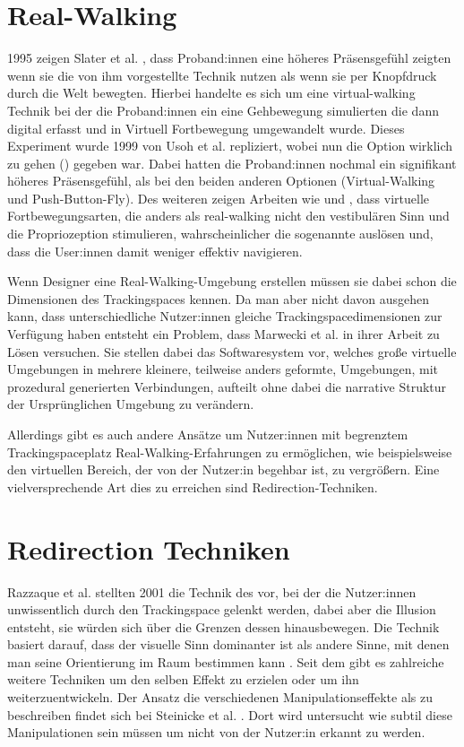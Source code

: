 \section{Real-Walking}
1995 zeigen Slater et al. \cite{taking-steps}, dass Proband:innen eine höheres Präsensgefühl zeigten wenn sie die von ihm vorgestellte Technik  nutzen als wenn sie per Knopfdruck durch die Welt bewegten. Hierbei handelte es sich um eine virtual-walking Technik bei der die Proband:innen ein eine Gehbewegung simulierten die dann digital erfasst und in Virtuell Fortbewegung umgewandelt wurde. Dieses Experiment wurde 1999 von Usoh et al. \cite{usoh-vergleich-1999} repliziert, wobei nun die Option wirklich zu gehen () gegeben war. Dabei hatten die Proband:innen nochmal ein signifikant höheres Präsensgefühl, als bei den beiden anderen Optionen (Virtual-Walking und Push-Button-Fly).
Des weiteren zeigen Arbeiten wie \cite{benefits-real-walking} und \cite{locomotion-path-integration}, dass virtuelle Fortbewegungsarten, die anders als real-walking nicht den vestibulären Sinn und die Propriozeption stimulieren, wahrscheinlicher die sogenannte  auslösen und, dass die User:innen damit weniger effektiv navigieren.

Wenn Designer eine Real-Walking-Umgebung erstellen müssen sie dabei schon die Dimensionen des Trackingspaces kennen. Da man aber nicht davon ausgehen kann, dass unterschiedliche Nutzer:innen gleiche Trackingspacedimensionen zur Verfügung haben entsteht ein Problem, dass Marwecki et al. in ihrer Arbeit \cite{scenograph} zu Lösen versuchen. Sie stellen dabei das Softwaresystem  vor, welches große virtuelle Umgebungen in mehrere kleinere, teilweise anders geformte, Umgebungen, mit prozedural generierten Verbindungen, aufteilt ohne dabei die narrative Struktur der Ursprünglichen Umgebung zu verändern.

Allerdings gibt es auch andere Ansätze um Nutzer:innen mit begrenztem Trackingspaceplatz Real-Walking-Erfahrungen zu ermöglichen, wie beispielsweise den virtuellen Bereich, der von der Nutzer:in begehbar ist, zu vergrößern.
Eine vielversprechende Art dies zu erreichen sind Redirection-Techniken.

\section{Redirection Techniken}
Razzaque et al. \cite{rdw-razzaque} stellten 2001 die Technik des  vor, bei der die Nutzer:innen unwissentlich durch den Trackingspace gelenkt werden, dabei aber die Illusion entsteht, sie würden sich über die Grenzen dessen hinausbewegen. Die Technik basiert darauf, dass der visuelle Sinn dominanter ist als andere Sinne, mit denen man seine Orientierung im Raum bestimmen kann \cite{conflicting}. Seit dem gibt es zahlreiche weitere Techniken um den selben Effekt zu erzielen oder um ihn weiterzuentwickeln. Der Ansatz die verschiedenen Manipulationseffekte als  zu beschreiben findet sich bei Steinicke et al. \cite{detection-thresholds}. Dort wird untersucht wie subtil diese Manipulationen sein müssen um nicht von der Nutzer:in erkannt zu werden.

